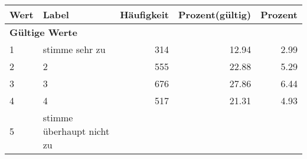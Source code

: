      \begin{longtable}{lXrrr}
     \toprule
     \textbf{Wert} & \textbf{Label} & \textbf{Häufigkeit} & \textbf{Prozent(gültig)} & \textbf{Prozent} \\
     \endhead
     \midrule
     \multicolumn{5}{l}{\textbf{Gültige Werte}}\\

     1 &
     \multicolumn{1}{X}{ stimme sehr zu   } &


       \num{314} &
       \num[round-mode=places,round-precision=2]{12.94} &
         \num[round-mode=places,round-precision=2]{2.99} \\

     2 &
     \multicolumn{1}{X}{ 2   } &


       \num{555} &
       \num[round-mode=places,round-precision=2]{22.88} &
         \num[round-mode=places,round-precision=2]{5.29} \\

     3 &
     \multicolumn{1}{X}{ 3   } &


       \num{676} &
       \num[round-mode=places,round-precision=2]{27.86} &
         \num[round-mode=places,round-precision=2]{6.44} \\

     4 &
     \multicolumn{1}{X}{ 4   } &


       \num{517} &
       \num[round-mode=places,round-precision=2]{21.31} &
         \num[round-mode=places,round-precision=2]{4.93} \\

     5 &
     \multicolumn{1}{X}{ stimme überhaupt nicht zu   } &



\end{longtable}
